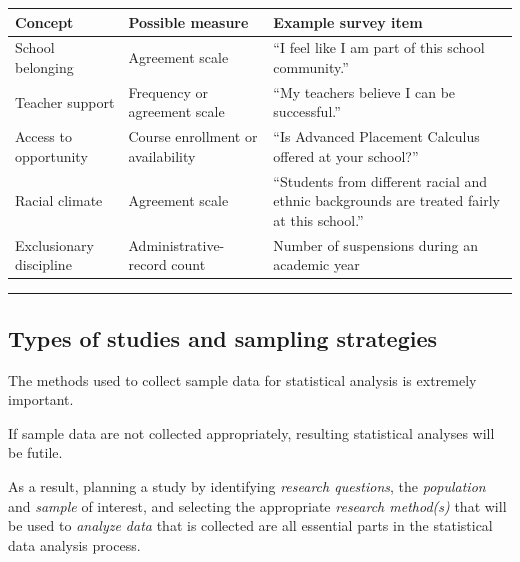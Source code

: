 \documentclass[
  letterpaper,
  DIV=11,
  numbers=noendperiod]{scrartcl}
\begin{document}
\begin{longtable}[]{@{}
  >{\raggedright\arraybackslash}p{}
  >{\raggedright\arraybackslash}p{}
  >{\raggedright\arraybackslash}p{}@{}}
\toprule\noalign{}
\begin{minipage}[b]{\linewidth}\raggedright
Concept
\end{minipage} & \begin{minipage}[b]{\linewidth}\raggedright
Possible measure
\end{minipage} & \begin{minipage}[b]{\linewidth}\raggedright
Example survey item
\end{minipage} \\
\midrule\noalign{}
\endhead
\bottomrule\noalign{}
\endlastfoot
School belonging & Agreement scale & ``I feel like I am part of this
school community.'' \\
Teacher support & Frequency or agreement scale & ``My teachers believe I
can be successful.'' \\
Access to opportunity & Course enrollment or availability & ``Is
Advanced Placement Calculus offered at your school?'' \\
Racial climate & Agreement scale & ``Students from different racial and
ethnic backgrounds are treated fairly at this school.'' \\
Exclusionary discipline & Administrative-record count & Number of
suspensions during an academic year \\
\end{longtable}

\begin{center}\rule{0.5\linewidth}{0.5pt}\end{center}

\subsection{Types of studies and sampling
strategies}\label{types-of-studies-and-sampling-strategies}

The methods used to collect sample data for statistical analysis is
extremely important.

If sample data are not collected appropriately, resulting statistical
analyses will be futile.

As a result, planning a study by identifying \emph{research questions},
the \emph{population} and \emph{sample} of interest, and selecting the
appropriate \emph{research method(s)} that will be used to \emph{analyze
data} that is collected are all essential parts in the statistical data
analysis process.
\end{document}
